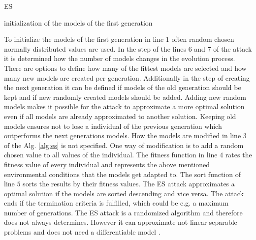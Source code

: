 \SetAlCapHSkip{0.2em}
\begin{algorithm}[H] %
\Indm
\SetAlgoLined
\caption{\acl{ES}}
\label{alg:es}
\Indp

initialization of the models of the first generation\\
\end{algorithm}

To initialize the models of the first generation in line $1$ often random chosen normally distributed values are used.
In the step of the lines $6$ and $7$ of the attack it is determined how the number of models changes in the evolution process.
There are options to define how many of the fittest models are selected and how many new models are created per generation.
Additionally in the step of creating the next generation it can be defined if models of the old generation should be kept and if new randomly created models should be added.
Adding new random models makes it possible for the attack to approximate a more optimal solution even if all models are already approximated to another solution. %
Keeping old models ensures not to lose a individual of the previous generation which outperforms the next generations models.
How the models are modified in line $3$ of the Alg. \ref{alg:es} is not specified.
One way of modification is to add a random chosen value to all values of the individual.
The fitness function in line $4$ rates the fitness value of every individual and represents the above mentioned environmental conditions that the models get adapted to.
The sort function of line $5$ sorts the results by their fitness values.
The \ac{ES} attack approximates a optimal solution if the models are sorted descending and vice versa.
The attack ends if the termination criteria is fulfilled, which could be e.g. a maximum number of generations.
The \ac{ES} attack is a randomized algorithm and therefore does not always determines.
However it can approximate not linear separable problems and does not need a differentiable model \cite{Ruhrmair2010ModelingFunctions}.
	

